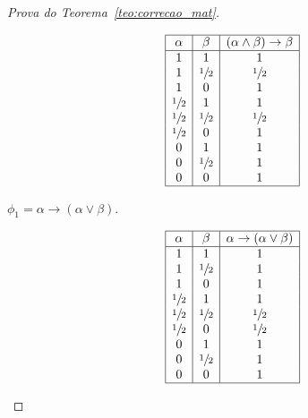 \begin{proof}[Prova do Teorema~\ref{teo:correcao_mat}]
\begin{provaporcasos}
\begin{provaporsubcasos}
                    \begin{center}
                        \[
                            \begin{array}{|c|c|c|}%
                                \hline%
                                \alpha      & \beta & (\alpha \land \beta) \to \beta \\
                                \hline%
                                1 & 1 & 1\\
                                1 & \meio{} & \meio{}\\
                                1 & 0 & 1\\
                                \meio{} & 1 & 1\\
                                \meio{} & \meio{} & \meio{}\\
                                \meio{} & 0 & 1\\
                                0 & 1 & 1\\
                                0 & \meio{} & 1\\
                                0 & 0 & 1\\
                                \hline%
                            \end{array}
                        \]
                    \end{center}

                    \subcasodeprova{} $\phi_{1} = \alpha \to (\alpha \lor \beta)$. 

                    \begin{center}
                        \[
                            \begin{array}{|c|c|c|}%
                                \hline%
                                \alpha      & \beta & \alpha \to (\alpha \lor \beta) \\
                                \hline%
                                1 & 1 &1\\
                                1 & \meio{} &1\\
                                1 & 0 &1\\
                                \meio{} & 1 &1\\
                                \meio{} & \meio{} &\meio{}\\
                                \meio{} & 0 &\meio{}\\
                                0 & 1 &1\\
                                0 & \meio{} &1\\
                                0 & 0 &1\\
                                \hline%
                            \end{array}
                        \]
                    \end{center}
                    

\end{provaporsubcasos}
\end{provaporcasos}
\end{proof}
